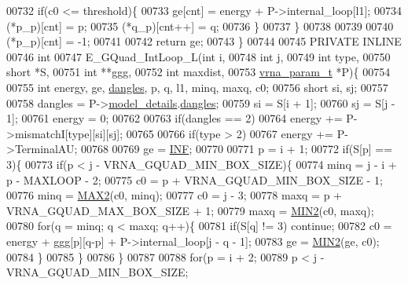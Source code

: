 \begin{DoxyCode}
00732         \textcolor{keywordflow}{if}(c0 <= threshold)\{
00733           ge[cnt]       = energy + P->internal\_loop[l1];
00734           (*p\_p)[cnt]   = p;
00735           (*q\_p)[cnt++] = q;
00736         \}
00737     \}
00738 
00739 
00740   (*p\_p)[cnt] = -1;
00741 
00742   \textcolor{keywordflow}{return} ge;
00743 \}
00744 
00745 PRIVATE INLINE
00746 \textcolor{keywordtype}{int}
00747 E\_GQuad\_IntLoop\_L(\textcolor{keywordtype}{int} i,
00748                   \textcolor{keywordtype}{int} j,
00749                   \textcolor{keywordtype}{int} type,
00750                   \textcolor{keywordtype}{short} *S,
00751                   \textcolor{keywordtype}{int} **ggg,
00752                   \textcolor{keywordtype}{int} maxdist,
00753                   \hyperlink{group__energy__parameters_structvrna__param__s}{vrna\_param\_t} *P)\{
00754 
00755   \textcolor{keywordtype}{int} energy, ge, \hyperlink{group__model__details_ga72b511ed1201f7e23ec437e468790d74}{dangles}, p, q, l1, minq, maxq, c0;
00756   \textcolor{keywordtype}{short} si, sj;
00757 
00758   dangles = P->\hyperlink{group__energy__parameters_a7b84353eb9075c595bad4ceb871bcae7}{model\_details}.\hyperlink{group__model__details_adcda4ff2ea77748ae0e8700288282efc}{dangles};
00759   si      = S[i + 1];
00760   sj      = S[j - 1];
00761   energy  = 0;
00762 
00763   \textcolor{keywordflow}{if}(dangles == 2)
00764     energy += P->mismatchI[type][si][sj];
00765 
00766   \textcolor{keywordflow}{if}(type > 2)
00767     energy += P->TerminalAU;
00768 
00769   ge = \hyperlink{energy__const_8h_a12c2040f25d8e3a7b9e1c2024c618cb6}{INF};
00770 
00771   p = i + 1;
00772   \textcolor{keywordflow}{if}(S[p] == 3)\{
00773     \textcolor{keywordflow}{if}(p < j - VRNA\_GQUAD\_MIN\_BOX\_SIZE)\{
00774       minq  = j - i + p - MAXLOOP - 2;
00775       c0    = p + VRNA\_GQUAD\_MIN\_BOX\_SIZE - 1;
00776       minq  = \hyperlink{group__utils_ga33297b3679c713b0c4d897cd0fe3b122}{MAX2}(c0, minq);
00777       c0    = j - 3;
00778       maxq  = p + VRNA\_GQUAD\_MAX\_BOX\_SIZE + 1;
00779       maxq  = \hyperlink{group__utils_gae0b9cd0ce090bd69b951aa73e8fa4f7d}{MIN2}(c0, maxq);
00780       \textcolor{keywordflow}{for}(q = minq; q < maxq; q++)\{
00781         \textcolor{keywordflow}{if}(S[q] != 3) \textcolor{keywordflow}{continue};
00782         c0  = energy + ggg[p][q-p] + P->internal\_loop[j - q - 1];
00783         ge  = \hyperlink{group__utils_gae0b9cd0ce090bd69b951aa73e8fa4f7d}{MIN2}(ge, c0);
00784       \}
00785     \}
00786   \}
00787 
00788   \textcolor{keywordflow}{for}(p = i + 2;
00789       p < j - VRNA\_GQUAD\_MIN\_BOX\_SIZE;

\end{DoxyCode}

